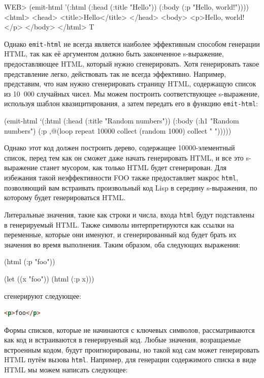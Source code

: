 \begin{myverb}
WEB> (emit-html '(:html (:head (:title "Hello")) (:body (:p "Hello, world!"))))
<html>
  <head>
    <title>Hello</title>
  </head>
  <body>
    <p>Hello, world!</p>
  </body>
</html>
T
\end{myverb}

Однако \lstinline{emit-html} не всегда является наиболее эффективным способом генерации
HTML, так как её аргументом должно быть законченное s-выражение, предоставляющее HTML,
который нужно сгенерировать. Хотя генерировать такое представление легко, действовать так
не всегда эффективно. Например, представим, что нам нужно сгенерировать страницу HTML,
содержащую список из 10~000 случайных чисел. Мы можем построить соответствующее
s-выражение, используя шаблон квазицитирования, а затем передать его в функцию
\lstinline{emit-html}:

\begin{myverb}
(emit-html
  `(:html
     (:head
       (:title "Random numbers"))
     (:body 
       (:h1 "Random numbers")
       (:p ,@(loop repeat 10000 collect (random 1000) collect " ")))))
\end{myverb}

Однако этот код должен построить дерево, содержащее 10000-элементный список, перед тем как
он сможет даже начать генерировать HTML, и все это s-выражение станет мусором, как только
HTML будет сгенерирован. Для избежания такой неэффективности FOO также
предоставляет макрос \lstinline{html}, позволяющий вам встраивать произвольный код Lisp в
середину s-выражения, по которому будет генерироваться HTML.

Литеральные значения, такие как строки и числа, входа \lstinline{html} будут подставлены в
генерируемый HTML. Также символы интерпретируются как ссылки на переменные, которые они
именуют, и сгенерированный код будет брать их значения во время выполнения. Таким образом,
оба следующих выражения:

\begin{myverb}
(html (:p "foo"))

(let ((x "foo")) (html (:p x)))
\end{myverb}

\noindent{}сгенерируют следующее:

\begin{lstlisting}[language=HTML]
<p>foo</p>
\end{lstlisting}

Формы списков, которые не начинаются с ключевых символов, рассматриваются как код и
встраиваются в генерируемый код. Любые значения, возращаемые встроенным кодом, будут
проигнорированы, но такой код сам может генерировать HTML путём вызова
\lstinline{html}. Например, для генерации содержимого списка в виде HTML мы можем написать
следующее:

